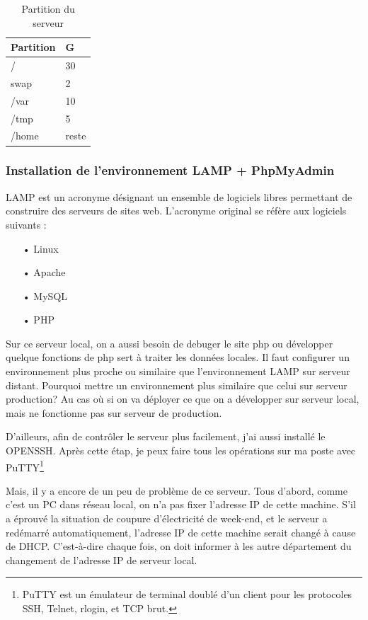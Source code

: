 \begin{table}[htbp]
\centering
\begin{tabular}{ll}
  \toprule
  Partition & G\\
  \midrule
	/ & 30 \\ 
	\hline 
	swap & 2 \\ 
	\hline 
	/var & 10 \\ 
	\hline 
	/tmp & 5 \\ 
	\hline 
	/home & reste \\
  \bottomrule
\end{tabular}
 \caption{\label{tab:Partition du serveur}Partition du serveur}
\end{table}

\subsubsection{Installation de l'environnement LAMP + PhpMyAdmin}
LAMP est un acronyme désignant un ensemble de logiciels libres permettant de construire des serveurs de sites web. L'acronyme original se réfère aux logiciels suivants :
\begin{itemize}
\item[•] Linux 
\item[•] Apache 
\item[•] MySQL 
\item[•] PHP 
\end{itemize}
Sur ce serveur local, on a aussi besoin de debuger le site php ou développer quelque fonctions de php sert à traiter les données locales. Il faut configurer un environnement plus proche ou similaire que l'environnement LAMP sur serveur distant. Pourquoi mettre un environnement plus similaire que celui sur serveur production? Au cas où si on va déployer ce que on a développer sur serveur local, mais ne fonctionne pas sur serveur de production. 

D'ailleurs, afin de contrôler le serveur plus facilement, j'ai aussi installé le OPENSSH. Après cette étap, je peux faire tous les opérations sur ma poste avec PuTTY\footnote{PuTTY est un émulateur de terminal doublé d'un client pour les protocoles SSH, Telnet, rlogin, et TCP brut.}

Mais, il y a encore de un peu de problème de ce serveur. Tous d'abord, comme c'est un PC dans réseau local, on n'a pas fixer l'adresse IP de cette machine. S'il a éprouvé la situation de coupure d'électricité de week-end, et le serveur a redémarré automatiquement, l'adresse IP de cette machine serait changé à cause de DHCP. C'est-à-dire chaque fois, on doit informer à les autre département du changement de l'adresse IP de serveur local.

